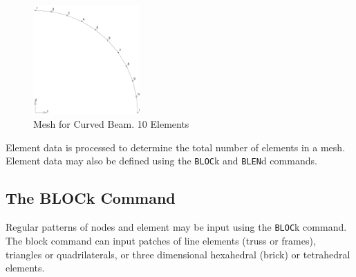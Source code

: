 \begin{figure}[ht!]
\centerline {\hfil \includegraphics[width=1.6in]{figs/fig7_2} \hfil}
\caption{Mesh for Curved Beam.  10 Elements}
\label{fig72}
\end{figure}

Element data is processed to determine the total number of elements in a mesh.
Element data may also be defined using the {\tt BLOC}k and {\tt BLEN}d commands.

\subsection{The BLOCk Command}
\label{block}

Regular patterns of nodes and element may be input using the
{\tt BLOC}k command.  The block command can input patches of line
elements (truss or frames), triangles or quadrilaterals, or three
dimensional hexahedral (brick) or tetrahedral elements.

